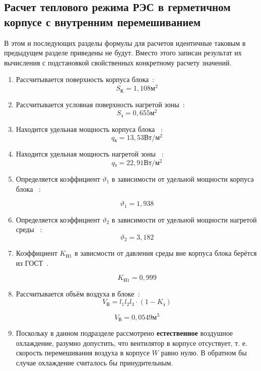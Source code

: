\subsection{Расчет теплового режима РЭС в герметичном корпусе с внутренним перемешиванием}

В этом и последующих разделы формулы для расчетов идентичные таковым в
предыдущем разделе приведены не будут. Вместо этого записан результат
их вычисления с подстановкой свойственных конкретному расчету
значений.

\begin{enumerate}[label={\arabic*.}]
\item Рассчитывается поверхность корпуса блока~\cite{Rotkop1976}: %
  $$S\mathrm{_{К}}=1,108\mathrm{м^2}$$
\item Рассчитывается условная поверхность нагретой зоны~\cite{Rotkop1976}: %
  $$S\mathrm{_{з}} = 0,655\mathrm{м^2}$$ 
\item Находится удельная мощность корпуса блока ~\cite{Rotkop1976}:  %
  $$q\mathrm{_к} = 13,53\mathrm{Вт/м^2}$$
\item Находится удельная мощность нагретой зоны ~\cite{Rotkop1976}: %
  $$q\mathrm{_з} = 22,91 \mathrm{ Вт/м^2}$$

\item Определяется коэффициент $\vartheta_1$ в зависимости от удельной мощности корпуса блока ~\cite{Rotkop1976}:

  $$\vartheta_1=1,938$$
\item Определяется коэффициент $\vartheta_2$ в зависимости от удельной мощности нагретой среды ~\cite{Rotkop1976}:
  $$\vartheta_2=3,182$$

  \item Коэффициент $K\mathrm{_{Н1}}$ в зависмости от давления
  среды вне корпуса блока берётся из ГОСТ~\cite{GOST-15150-69}.

  $$K\mathrm{_{Н1}} = 0,999$$
\item Рассчитывается объём воздуха в блоке~\cite{Rotkop1976}:
  \begin{equation}
    V\mathrm{_{В}} = l_1 l_2 l_3 \cdot (1 - K\mathrm{_з})
  \end{equation}

  $$V\mathrm{_{В}} = 0,0549\mathrm{м^3}$$

\item Поскольку в данном подразделе
    рассмотрено \textbf{естественное} воздушное охлаждение,
    разумно допустить, что вентилятор в корпусе отсуствует, т. е.
    скорость перемешивания воздуха в корпусе $W$ равно нулю.
    В обратном бы случае охлаждение считалось бы принудительным.


\end{enumerate}
